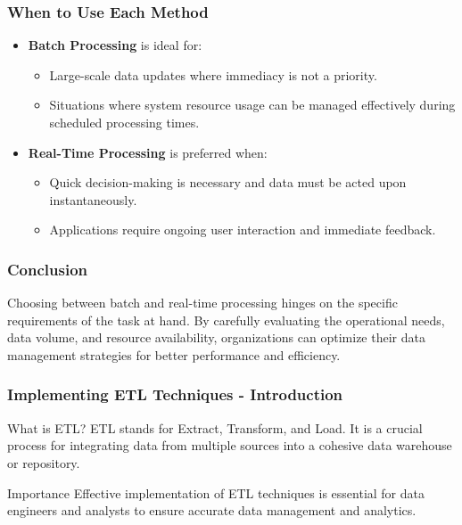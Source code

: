 \documentclass[aspectratio=169]{beamer}
\begin{document}
\begin{frame}[fragile]
    \frametitle{When to Use Each Method}
    \begin{itemize}
        \item \textbf{Batch Processing} is ideal for:
        \begin{itemize}
            \item Large-scale data updates where immediacy is not a priority.
            \item Situations where system resource usage can be managed effectively during scheduled processing times.
        \end{itemize}
        \item \textbf{Real-Time Processing} is preferred when:
        \begin{itemize}
            \item Quick decision-making is necessary and data must be acted upon instantaneously.
            \item Applications require ongoing user interaction and immediate feedback.
        \end{itemize}
    \end{itemize}
\end{frame}

\begin{frame}[fragile]
    \frametitle{Conclusion}
    Choosing between batch and real-time processing hinges on the specific requirements of the task at hand. By carefully evaluating the operational needs, data volume, and resource availability, organizations can optimize their data management strategies for better performance and efficiency.
\end{frame}

\begin{frame}[fragile]
    \frametitle{Implementing ETL Techniques - Introduction}
    \begin{block}{What is ETL?}
        ETL stands for Extract, Transform, and Load. It is a crucial process for integrating data from multiple sources into a cohesive data warehouse or repository.
    \end{block}
    \begin{block}{Importance}
        Effective implementation of ETL techniques is essential for data engineers and analysts to ensure accurate data management and analytics.
    \end{block}
\end{frame}
\end{document}
